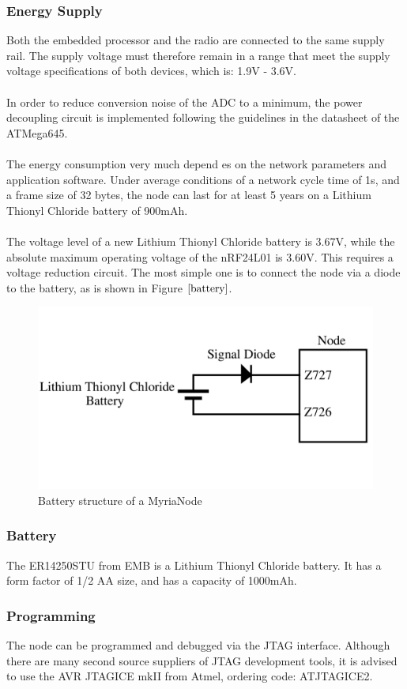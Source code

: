 \documentclass[a4paper,10pt]{report}
\begin{document}
\subsubsection{Energy Supply}
Both the embedded processor and the radio are connected to the same supply rail. The supply voltage must therefore remain in a range that meet the supply voltage specifications of both devices, which is: 1.9V - 3.6V. \paragraph*{}
In order to reduce conversion noise of the ADC to a minimum, the power decoupling circuit is implemented following the guidelines in the datasheet of the ATMega645. \paragraph*{}
The energy consumption very much depend es on the network parameters and application software. Under average conditions of a network cycle time of 1s, and a frame size of 32 bytes, the node can last for at least 5 years on a Lithium Thionyl Chloride battery of 900mAh. \paragraph*{}
The voltage level of a new Lithium Thionyl Chloride battery is 3.67V, while the absolute maximum operating voltage of the nRF24L01 is 3.60V. This requires a voltage reduction circuit. The most simple one is to connect the node via a diode to the battery, as is shown in Figure $\ref{battery}$.
\begin{figure}[!h]
 \centering
 \includegraphics[width = 0.5 \textwidth]{battery}
 \caption{Battery structure of a MyriaNode}
 \label{battery}
\end{figure}
\subsubsection{Battery}
The ER14250STU from EMB is a Lithium Thionyl Chloride battery. It has a form factor of 1/2 AA size, and has a capacity of 1000mAh.
\subsubsection{Programming}
The node can be programmed and debugged via the JTAG interface. Although there are many second source suppliers of JTAG development tools, it is advised to use the AVR JTAGICE mkII from Atmel, ordering code: ATJTAGICE2.
\end{document}
